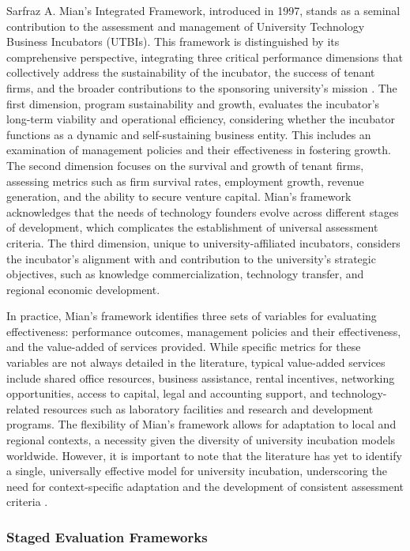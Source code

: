 \documentclass[../Main.tex]{subfiles}
\begin{document}
Sarfraz A. Mian's Integrated Framework, introduced in 1997, stands as a seminal contribution to the assessment and management of University Technology Business Incubators (UTBIs). This framework is distinguished by its comprehensive perspective, integrating three critical performance dimensions that collectively address the sustainability of the incubator, the success of tenant firms, and the broader contributions to the sponsoring university's mission \autocite{Chan2005Assessing}. The first dimension, program sustainability and growth, evaluates the incubator's long-term viability and operational efficiency, considering whether the incubator functions as a dynamic and self-sustaining business entity. This includes an examination of management policies and their effectiveness in fostering growth. The second dimension focuses on the survival and growth of tenant firms, assessing metrics such as firm survival rates, employment growth, revenue generation, and the ability to secure venture capital. Mian's framework acknowledges that the needs of technology founders evolve across different stages of development, which complicates the establishment of universal assessment criteria. The third dimension, unique to university-affiliated incubators, considers the incubator's alignment with and contribution to the university's strategic objectives, such as knowledge commercialization, technology transfer, and regional economic development.

In practice, Mian's framework identifies three sets of variables for evaluating effectiveness: performance outcomes, management policies and their effectiveness, and the value-added of services provided. While specific metrics for these variables are not always detailed in the literature, typical value-added services include shared office resources, business assistance, rental incentives, networking opportunities, access to capital, legal and accounting support, and technology-related resources such as laboratory facilities and research and development programs. The flexibility of Mian's framework allows for adaptation to local and regional contexts, a necessity given the diversity of university incubation models worldwide. However, it is important to note that the literature has yet to identify a single, universally effective model for university incubation, underscoring the need for context-specific adaptation and the development of consistent assessment criteria \autocite{Yovera2025Academic}.

\subsubsection{Staged Evaluation Frameworks}
\end{document}
